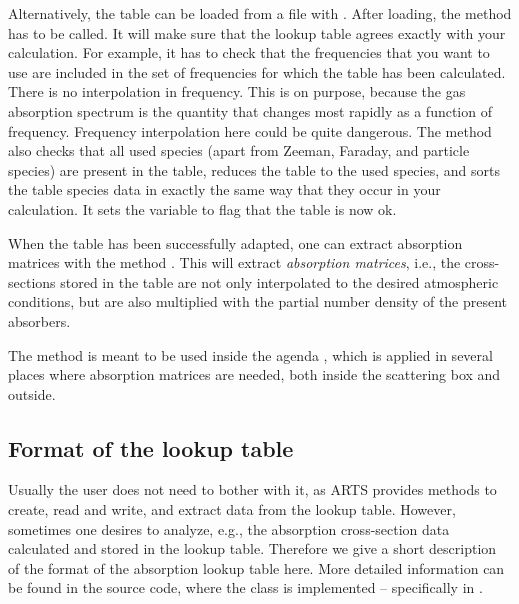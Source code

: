Alternatively, the table can be loaded from a file with
.  After loading, the method
 has to be called. It will make sure that
the lookup table agrees exactly with your calculation. For example, it
has to check that the frequencies that you want to use are included in
the set of frequencies for which the table has been calculated.  There
is no interpolation in frequency. This is on purpose, because the gas
absorption spectrum is the quantity that changes most rapidly as a
function of frequency. Frequency interpolation here could be quite
dangerous. The  method also checks that all used
species (apart from Zeeman, Faraday, and particle species) are present in the
table, reduces the table to the used species, and sorts the table species data in
exactly the same way that they occur in your calculation. It sets the variable
 to flag that the table is now ok. 

When the table has been successfully adapted, one can extract
absorption matrices with the method
. This will extract
\emph{absorption matrices}, i.e., the cross-sections stored in the
table are not only interpolated to the desired atmospheric conditions,
but are also multiplied with the partial number density of the present
absorbers.

The  method is meant to
be used inside the agenda ,
which is applied in several places where absorption matrices are
needed, both inside the scattering box and outside.

\subsection{Format of the lookup table}
Usually the user does not need to bother with it, as ARTS provides methods to
create, read and write, and extract data from the lookup table. However,
sometimes one desires to analyze, e.g., the absorption cross-section data
calculated and stored in the lookup table. Therefore we give a short description
of the format of the absorption lookup table here. More detailed information can
be found in the source code, where the  class is
implemented -- specifically in .

